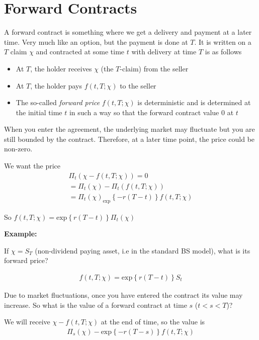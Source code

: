 \section{Forward Contracts}
\noindent A forward contract is something where we get a delivery and payment at a later time. Very much like an option, but the payment is done at $T$. It is written on a $T$ claim $\chi$ and contracted at some time $t$ with delivery at time $T$ is as follows\par
\begin{itemize}
  \item At $T$, the holder receives $\chi$ (the $T$-claim) from the seller
  \item At $T$, the holder pays $f(t,T;\chi)$ to the seller
  \item The so-called \textit{forward price} $f(t,T;\chi)$ is deterministic and is determined at the initial time $t$ in such a way so that the forward contract value 0 at $t$
\end{itemize}
\par\bigskip
\noindent When you enter the agreement, the underlying market may fluctuate but you are still bounded by the contract. Therefore, at a later time point, the price could be non-zero.\par
\noindent We want the price
\begin{equation*}
  \begin{gathered}
    \Pi_t(\chi-f(t,T;\chi)) = 0\\
    = \Pi_t(\chi)-\Pi_t(f(t,T;\chi))\\
    =\Pi_t(\chi)_\text{exp}\left\{-r(T-t)\right\}f(t,T;\chi)
  \end{gathered}
\end{equation*}\par
\noindent So $f(t,T;\chi) = \text{exp}\left\{r(T-t)\right\}\Pi_t(\chi)$\par
\par\bigskip
\noindent\textbf{Example:}\par
\noindent If $\chi =S_T$ (non-dividend paying asset, i.e in the standard BS model), what is its forward price?\par
\begin{equation*}
  \begin{gathered}
    f(t,T;\chi)=\text{exp}\left\{r(T-t)\right\}S_t
  \end{gathered}
\end{equation*}
\par\bigskip
\noindent Due to market fluctuations, once you have entered the contract its value may increase. So what is the value of a forward contract at time $s$ ($t<s<T$)?\par
\noindent We will receive $\chi-f(t,T;\chi)$ at the end of time, so the value is 
\begin{equation*}
  \begin{gathered}
    \Pi_s(\chi)-\text{exp}\left\{-r(T-s)\right\}f(t,T;\chi)
  \end{gathered}
\end{equation*}
